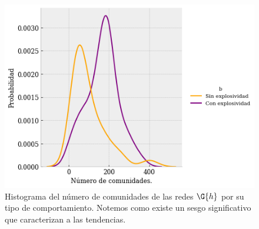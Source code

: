 \documentclass[../main.tex]{subfiles}
\begin{document}
\begin{figure}
    \centering
    \includegraphics[scale = 0.6]{images/resultados_comparativocomunidades.png}
    \caption{Histograma del número de comunidades de las redes $\G{h}$ por su tipo de comportamiento. Notemos como existe un sesgo significativo que caracterizan a las tendencias.}
    \label{fig:resultados_lenComunidades}
\end{figure}








\end{document}
